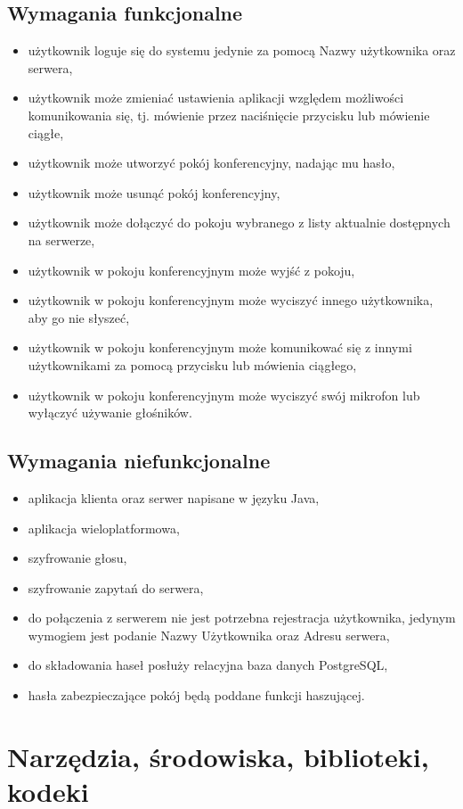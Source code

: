 \documentclass[12pt,a4paper,notitlepage]{report}
\begin{document}
	\subsection{Wymagania funkcjonalne}
	\begin{itemize}
		\item użytkownik loguje się do systemu jedynie za pomocą Nazwy użytkownika oraz serwera,
		\item użytkownik może zmieniać ustawienia aplikacji względem możliwości komunikowania się, tj. mówienie przez naciśnięcie przycisku lub mówienie ciągłe,
		\item użytkownik może utworzyć pokój konferencyjny, nadając mu hasło,
		\item użytkownik może usunąć pokój konferencyjny,
		\item użytkownik może dołączyć do pokoju wybranego z listy aktualnie dostępnych na serwerze,
		\item użytkownik w pokoju konferencyjnym może wyjść z pokoju,
		\item użytkownik w pokoju konferencyjnym może wyciszyć innego użytkownika, aby go nie słyszeć,
		\item użytkownik w pokoju konferencyjnym może komunikować się z innymi użytkownikami za pomocą przycisku lub mówienia ciągłego,
		\item użytkownik w pokoju konferencyjnym może wyciszyć swój mikrofon lub wyłączyć używanie głośników.
	\end{itemize}
	\subsection{Wymagania niefunkcjonalne}
	\begin{itemize}
		\item aplikacja klienta oraz serwer napisane w języku Java,
		\item aplikacja wieloplatformowa,
		\item szyfrowanie głosu,
		\item szyfrowanie zapytań do serwera,
		\item do połączenia z serwerem nie jest potrzebna rejestracja użytkownika, jedynym wymogiem jest podanie Nazwy Użytkownika oraz Adresu serwera,
		\item do składowania haseł posłuży relacyjna baza danych PostgreSQL,
		\item hasła zabezpieczające pokój będą poddane funkcji haszującej.
	\end{itemize}
	\section{Narzędzia, środowiska, biblioteki, kodeki}
\end{document}
